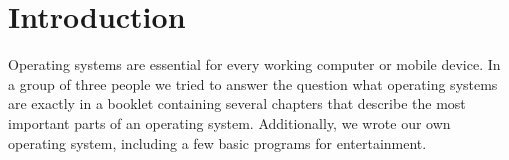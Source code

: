 \section{Introduction}

Operating systems are essential for every working computer or mobile device. In a group of three people we tried to answer the question what operating 
systems are exactly in a booklet containing several chapters that describe the most important parts of an operating system. Additionally, we wrote our own 
operating system, including a few basic programs for entertainment.

